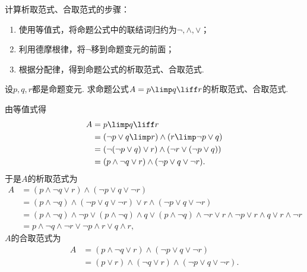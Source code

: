 计算析取范式、合取范式的步骤：\begin{enumerate}
	\item 使用等值式，将命题公式中的联结词归约为\(\neg,\land,\lor\)；
	\item 利用德摩根律，将\(\neg\)移到命题变元的前面；
	\item 根据分配律，得到命题公式的析取范式、合取范式.
\end{enumerate}

\begin{example}
设\(p,q,r\)都是命题变元.
求命题公式\(A = p \limp q \liff r\)的析取范式、合取范式.
\begin{solution}
由等值式得\begin{align*}
	A &= p \limp q \liff r \\
	&= (\neg p \lor q \limp r) \land (r \limp \neg p \lor q) \\
	&= (\neg(\neg p \lor q) \lor r) \land (\neg r \lor (\neg p \lor q)) \\
	&= (p \land \neg q \lor r) \land (\neg p \lor q \lor \neg r).
\end{align*}
于是\(A\)的析取范式为\begin{align*}
	A &= (p \land \neg q \lor r) \land (\neg p \lor q \lor \neg r) \\
	&= (p \land \neg q) \land (\neg p \lor q \lor \neg r)
		\lor r \land (\neg p \lor q \lor \neg r) \\
	&= (p \land \neg q) \land \neg p
		\lor (p \land \neg q) \land q
		\lor (p \land \neg q) \land \neg r
		\lor r \land \neg p
		\lor r \land q
		\lor r \land \neg r \\
	&= p \land \neg q \land \neg r
		\lor \neg p \land r
		\lor q \land r,
\end{align*}
\(A\)的合取范式为\begin{align*}
	A &= (p \land \neg q \lor r) \land (\neg p \lor q \lor \neg r) \\
	&= (p \lor r) \land (\neg q \lor r) \land (\neg p \lor q \lor \neg r).
\end{align*}
\end{solution}
\end{example}

